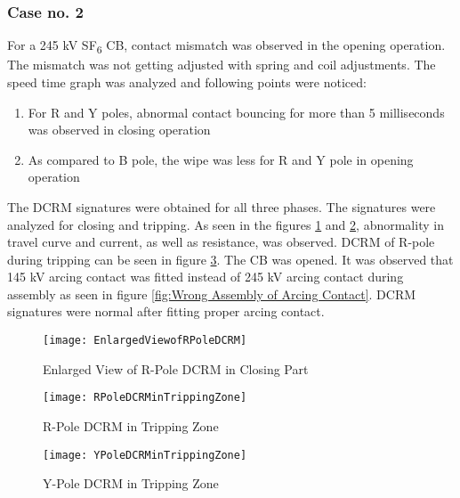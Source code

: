 \subsubsection*{Case no. 2}
For a 245 kV SF\textsubscript{6} CB, contact mismatch was observed in the opening operation. The mismatch was not getting adjusted with spring and coil adjustments. The speed time graph was analyzed and following points were noticed:

\begin{enumerate}
\item For R and Y poles, abnormal contact bouncing for more than 5 milliseconds was observed in closing operation

\item As compared to B pole, the wipe was less for R and Y pole in opening operation
\end{enumerate}

The DCRM signatures were obtained for all three phases. The signatures were analyzed for closing and tripping. As seen in the figures \ref{fig:Enlarged View of R-Pole DCRM in Closing Part} and \ref{fig:R-Pole DCRM in Tripping Zone}, abnormality in travel curve and current, as well as resistance, was observed. DCRM of R-pole during tripping can be seen in figure \ref{fig:Y-Pole DCRM in Tripping Zone}. The CB was opened. It was observed that 145 kV arcing contact was fitted instead of 245 kV arcing contact during assembly as seen in figure \ref{fig:Wrong Assembly of Arcing Contact}. DCRM signatures were normal after fitting proper arcing contact.

\begin{figure}[!htbp]
    \centering
    \texttt{[image: EnlargedViewofRPoleDCRM]}
    \caption{Enlarged View of R-Pole DCRM in Closing Part}
    \label{fig:Enlarged View of R-Pole DCRM in Closing Part}
\end{figure}

\begin{figure}[!htbp]
    \centering
    \texttt{[image: RPoleDCRMinTrippingZone]}
    \caption{R-Pole DCRM in Tripping Zone}
    \label{fig:R-Pole DCRM in Tripping Zone}
\end{figure}

\begin{figure}[!htbp]
    \centering
    \texttt{[image: YPoleDCRMinTrippingZone]}
    \caption{Y-Pole DCRM in Tripping Zone}
    \label{fig:Y-Pole DCRM in Tripping Zone}
\end{figure}

